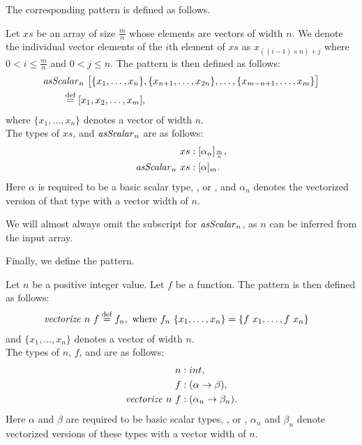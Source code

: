 \noindent
The corresponding \asScalar pattern is defined as follows.
\begin{definition}
  \label{definition:pattern:asScalar}
  Let $xs$ be an array of size $\frac{m}{n}$ whose elements are vectors of width $n$.
  We denote the individual vector elements of the $i$th element of $xs$ as $x_{((i-1)\times n)+j}$ where $0 < i \leq \frac{m}{n}$ and $0 < j \leq n$.
  The \asScalar pattern is then defined as follows:
  \begin{align*}
    &\text{\textit{asScalar}}_n\ \big[\{x_1, \ldots, x_n\}, \{x_{n+1}, \ldots, x_{2n}\}, \ldots, \{x_{m-n+1}, \ldots, x_m\}\big] \\
    & \qquad \stackrel{\textrm{\scriptsize def}}{=} [x_1, x_2, \dots, x_m],
  \end{align*}
  where $\{x_1,\ldots,x_n\}$ denotes a vector of width $n$.\\
  The types of $xs$, and $\text{\textit{asScalar}}_n$ are as follows:
  \begin{align*}
    xs &: [\alpha_n]_{\frac{m}{n}},\\
    \text{\textit{asScalar}}_n\ xs &: [\alpha]_m .
  \end{align*}
  Here $\alpha$ is required to be a basic scalar type, \eg,  or , and $\alpha_n$ denotes the vectorized version of that type with a vector width of $n$.
\end{definition}

We will almost always omit the subscript for $\text{\textit{asScalar}}_n$, as $n$ can be inferred from the input array.

\bigskip

Finally, we define the \vect pattern.
\begin{definition}
  \label{definition:pattern:vect}
  Let $n$ be a positive integer value.
  Let $f$ be a function.
  The \vect pattern is then defined as follows:
  \begin{align*}
    \text{\textit{vectorize}}\ n\ f &\stackrel{\textrm{\scriptsize def}}{=} f_n, \text{ where } f_n\ \{x_1, \ldots, x_n\} = \{f\ x_1, \ldots, f\ x_n \}
  \end{align*}
  and $\{x_1,\ldots,x_n\}$ denotes a vector of width $n$.\\
  The types of $n$, $f$, and \vect are as follows:
  \begin{align*}
    n &: int,\\
    f &: (\alpha \rightarrow \beta),\\
    \text{\textit{vectorize}}\ n\ f &: (\alpha_n \rightarrow \beta_n) .
  \end{align*}
  Here $\alpha$ and $\beta$ are required to be basic scalar types, \eg,  or , $\alpha_n$ and $\beta_n$ denote vectorized versions of these types with a vector width of $n$.
\end{definition}

